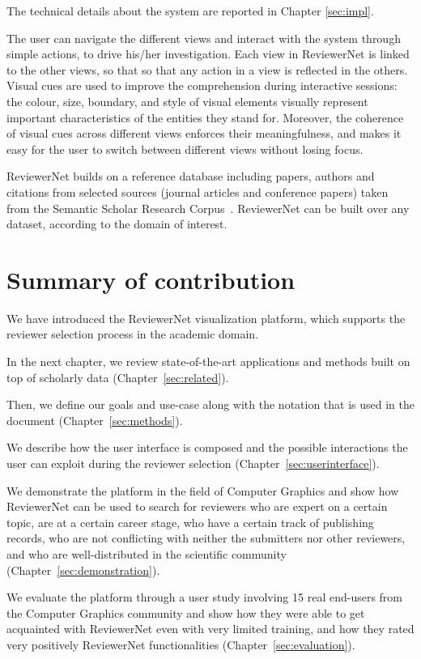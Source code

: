 The technical details about the system are reported in Chapter \ref{sec:impl}.

The user can navigate the different views and interact with the system through simple actions, to drive his/her investigation. Each view in ReviewerNet is linked to the other views, so that so that any action in a view is reflected in the others. Visual cues are used to improve the comprehension during interactive sessions: the colour, size, boundary, and style of visual elements visually represent important characteristics of the entities they stand for. Moreover, the coherence of visual cues across different views enforces their meaningfulness, and makes it easy for the user to switch between different views without losing focus.  

ReviewerNet builds on a reference database including papers, authors and citations from selected sources (journal articles and conference papers) taken from the Semantic Scholar Research Corpus~\cite{ammar:18}. ReviewerNet can be built over any dataset, according to the domain of interest.

\section{Summary of contribution}

We have introduced the ReviewerNet visualization platform, which supports the reviewer selection process in the academic domain. 

In the next chapter, we review state-of-the-art applications and methods built on top of scholarly data (Chapter~\ref{sec:related}).

Then, we define our goals and use-case along with the notation that is used in the document (Chapter~\ref{sec:methods}). 

We describe how the user interface is composed and the possible interactions the user can exploit during the reviewer selection (Chapter~\ref{sec:userinterface}). 

We demonstrate the platform in the field of Computer Graphics and show how ReviewerNet can be used to search for reviewers who are expert on a certain topic, are at a certain career stage, who have a certain track of publishing records, who are not conflicting with neither the submitters nor other reviewers, and who are well-distributed in the scientific community (Chapter~\ref{sec:demonstration}). 

We evaluate the platform through a user study involving 15 real end-users from the Computer Graphics community and show how they were able to get acquainted with ReviewerNet even with very limited training, and how they rated very positively ReviewerNet functionalities (Chapter~\ref{sec:evaluation}).  

